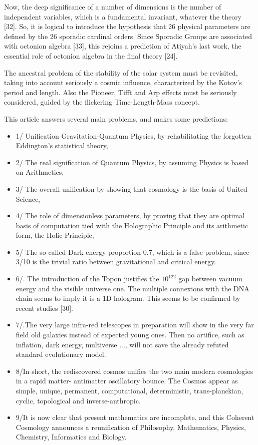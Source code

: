 \documentclass[twoside,draft]{article}
\begin{document}
\begin{sloppypar}
{Now, the deep significance of a number of dimensions is the number of independent variables,
which is a fundamental invariant, whatever the theory [32]. So, it is logical to introduce the
hypothesis that 26 physical parameters are defined by the 26 sporadic cardinal orders. Since
Sporadic Groups are associated with octonion algebra [33], this rejoins a prediction of Atiyah's last
work, the essential role of octonion algebra in the final theory [24].

The ancestral problem of the stability of the solar system must be revisited, taking into account
seriously a cosmic influence, characterized by the Kotov's period and length. Also the Pioneer, Tifft
and Arp effects must be seriously considered, guided by the flickering Time-Length-Mass concept.

This article answers several main problems, and makes some predictions: 
\begin{itemize}
\item 1/ Unification Gravitation-Quantum Physics, by
rehabilitating the forgotten Eddington's statistical theory, 
\item 2/ The real signification of Quantum
Physics, by assuming Physics is based on Arithmetics, 
\item 3/ The overall unification by showing that
cosmology is the basis of United Science, 
\item 4/ The role of dimensionless parameters, by proving that
they are optimal basis of computation tied with the Holographic Principle and its arithmetic form,
the Holic Principle, 
\item 5/ The so-called Dark energy proportion 0.7, which is a false problem, since
3/10 is the trivial ratio between gravitational and critical energy. 
\item 6/. The introduction of the Topon
justifies the $10^{122}$ gap between vacuum energy and the visible universe one.
The multiple connexions with the DNA chain seems to imply it is a 1D hologram. This seems to
be confirmed by recent studies [30].
\item 7/.The very large infra-red telescopes in preparation will show in the very far field old galaxies
instead of expected young ones. Then no artifice, such as inflation, dark energy, multiverse ..., will
not save the already refuted standard evolutionary model.
\item 8/In short, the rediscovered cosmos unifies the two main modern cosmologies in a rapid matter-
antimatter oscillatory bounce. The Cosmos appear as simple, unique, permanent, computational,
deterministic, trans-planckian, cyclic, topological and inverse-anthropic.
\item 9/It is now clear that present mathematics are incomplete, and this Coherent Cosmology
announces a reunification of Philosophy, Mathematics, Physics, Chemistry, Informatics and
Biology.
\end{itemize}


}
\end{sloppypar}
\end{document}
